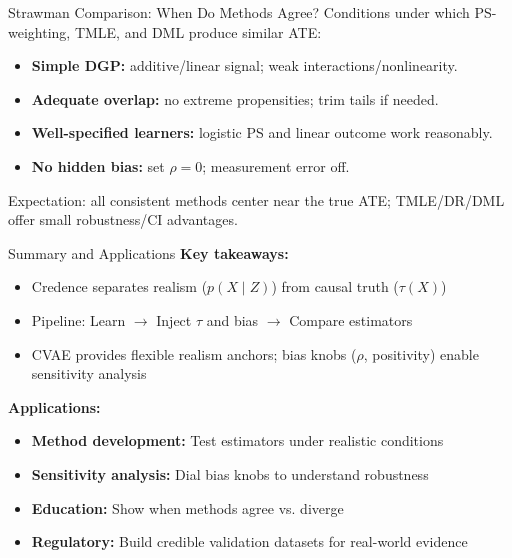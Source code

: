 \documentclass[aspectratio=169]{beamer}
\begin{document}
\begin{frame}{Strawman Comparison: When Do Methods Agree?}
  \small
  Conditions under which PS-weighting, TMLE, and DML produce similar ATE:
  \begin{itemize}
    \item \textbf{Simple DGP:} additive/linear signal; weak interactions/nonlinearity.
    \item \textbf{Adequate overlap:} no extreme propensities; trim tails if needed.
    \item \textbf{Well-specified learners:} logistic PS and linear outcome work reasonably.
    \item \textbf{No hidden bias:} set \(\rho=0\); measurement error off.
  \end{itemize}
  \vspace{0.3em}
  Expectation: all consistent methods center near the true ATE; TMLE/DR/DML offer small robustness/CI advantages.
\end{frame}


\begin{frame}{Summary and Applications}
  \small
  \textbf{Key takeaways:}
  \begin{itemize}
    \item Credence separates realism ($p(X\mid Z)$) from causal truth ($\tau(X)$)
    \item Pipeline: Learn $\rightarrow$ Inject $\tau$ and bias $\rightarrow$ Compare estimators
    \item CVAE provides flexible realism anchors; bias knobs ($\rho$, positivity) enable sensitivity analysis
  \end{itemize}
  \vspace{0.5em}

  \textbf{Applications:}
  \begin{itemize}
    \item \textbf{Method development:} Test estimators under realistic conditions
    \item \textbf{Sensitivity analysis:} Dial bias knobs to understand robustness
    \item \textbf{Education:} Show when methods agree vs. diverge
    \item \textbf{Regulatory:} Build credible validation datasets for real-world evidence
  \end{itemize}
\end{frame}
\end{document}
